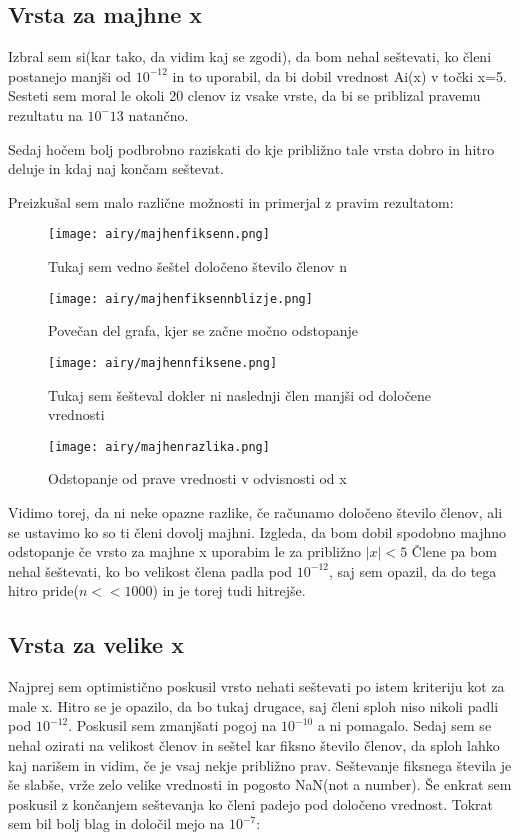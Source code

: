 \documentclass{article}
\begin{document}
\subsection{Vrsta za majhne x}

Izbral sem si(kar tako, da vidim kaj se zgodi), da bom nehal seštevati, ko členi postanejo manjši od $10^{-12}$ in to uporabil, da bi dobil vrednost Ai(x) v točki x=5. Sesteti sem moral le okoli 20 clenov iz vsake vrste, da bi se priblizal pravemu rezultatu na $10^-13$ natančno.

Sedaj hočem bolj podbrobno raziskati do kje približno tale vrsta dobro in hitro deluje in kdaj naj končam seštevat.

Preizkušal sem malo različne možnosti in primerjal z pravim rezultatom:
\newpage

\begin{figure}[H]

\texttt{[image: airy/majhenfiksenn.png]}
\caption*{Tukaj sem vedno šeštel določeno število členov n}
\end{figure}
\begin{figure}[H]
\texttt{[image: airy/majhenfiksennblizje.png]}
\caption*{Povečan del grafa, kjer se začne močno odstopanje}
\end{figure}
\newpage
\begin{figure}[H]
\texttt{[image: airy/majhennfiksene.png]}
\caption*{Tukaj sem šešteval dokler ni naslednji člen manjši od določene vrednosti}
\end{figure}
\begin{figure}[H]
\texttt{[image: airy/majhenrazlika.png]}
\caption*{Odstopanje od prave vrednosti v odvisnosti od x}
\end{figure}
\newpage

Vidimo torej, da ni neke opazne razlike, če računamo določeno število členov, ali se ustavimo ko so ti členi dovolj majhni.
Izgleda, da bom dobil spodobno majhno odstopanje če vrsto za majhne x uporabim le za približno $|x| < 5$
Člene pa bom nehal šeštevati, ko bo velikost člena padla pod $10^{-12}$, saj sem opazil, da do tega hitro pride($n << 1000$) in je torej tudi hitrejše.

\subsection{Vrsta za velike x}
 
Najprej sem optimistično poskusil vrsto nehati seštevati po istem kriteriju kot za male x. Hitro se je opazilo, da bo tukaj drugace, saj členi sploh niso nikoli padli pod $10^{-12}$. Poskusil sem zmanjšati pogoj na $10^{-10}$ a ni pomagalo. Sedaj sem se nehal ozirati na velikost členov in seštel kar fiksno število členov, da sploh lahko kaj narišem in vidim, če je vsaj nekje približno prav.
Seštevanje fiksnega števila je še slabše, vrže zelo velike vrednosti in pogosto NaN(not a number).
Še enkrat sem poskusil z končanjem seštevanja ko členi padejo pod določeno vrednost. Tokrat sem bil bolj blag in določil mejo na $10^{-7}$:
\end{document}
